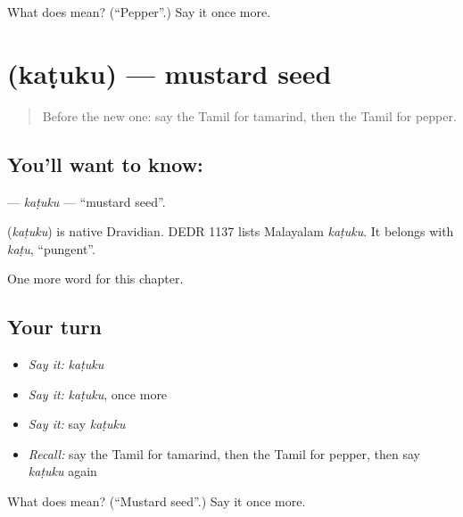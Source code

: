 \begin{tcolorbox}[breakable,colback=teal!4,colframe=teal!35!black,title={Before you move on}]
What does  mean? (\textquotedblleft{}Pepper\textquotedblright{}.) Say it once more.
\end{tcolorbox}
\section[\texorpdfstring{\ta{கடுகு} (kaṭuku)}{கடுகு (kaṭuku)}]{ (kaṭuku) — mustard seed}

\label{lesson:TA-C138-katuku}



\begin{quote}
Before the new one: say the Tamil for tamarind, then the Tamil for pepper.
\end{quote}

\subsection*{You'll want to know: }
\textbf{} — \emph{kaṭuku} — \textquotedblleft{}mustard seed\textquotedblright{}.

\begin{cousinweb}
\textbf{} (\emph{kaṭuku}) is native Dravidian. DEDR 1137 lists Malayalam \emph{kaṭuku}. It belongs with \emph{kaṭu}, \textquotedblleft{}pungent\textquotedblright{}.
\end{cousinweb}

\begin{grammarlens}[title={What you've built}]
One more word for this chapter.
\end{grammarlens}

\subsection*{Your turn}
\begin{itemize}
\raggedright
  \item \emph{Say it:} \emph{kaṭuku}
  \item \emph{Say it:} \emph{kaṭuku}, once more
  \item \emph{Say it:} say \emph{kaṭuku}
  \item \emph{Recall:} say the Tamil for tamarind, then the Tamil for pepper, then say \emph{kaṭuku} again
\end{itemize}

\begin{tcolorbox}[breakable,colback=teal!4,colframe=teal!35!black,title={Before you move on}]
What does  mean? (\textquotedblleft{}Mustard seed\textquotedblright{}.) Say it once more.
\end{tcolorbox}
